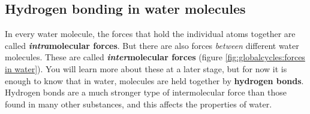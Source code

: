 \subsection{Hydrogen bonding in water molecules}

In every water molecule, the forces that hold the individual atoms together are called \textbf{\textit{intra}molecular forces}. But there are also forces \textit{between} different water molecules. These are called \textbf{\textit{inter}molecular forces} (figure \ref{fig:globalcycles:forces in water}). You will learn more about these at a later stage, but for now it is enough to know that in water, molecules are held together by \textbf{hydrogen bonds}. Hydrogen bonds are a much stronger type of intermolecular force than those found in many other substances, and this affects the properties of water.


